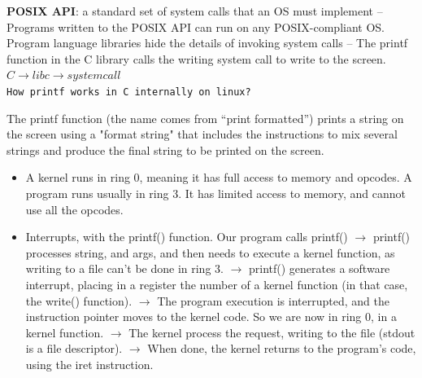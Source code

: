 \documentclass{article}
\begin{document}
\textbf{POSIX API}: a standard set of system calls that an OS must implement – Programs written to the POSIX API can run on any POSIX-compliant OS.
Program language libraries hide the details of invoking system calls – The printf function in the C library calls the writing system call to write to the screen. $C \rightarrow libc \rightarrow systemcall$\\

\texttt{How printf works in C internally on linux?}

The printf function (the name comes from “print formatted”) prints a string on the screen using a "format string" that includes the instructions to mix several strings and produce the final string to be printed on the screen.
\begin{itemize}
    \item A kernel runs in ring 0, meaning it has full access to memory and opcodes. A program runs usually in ring 3. It has limited access to memory, and cannot use all the opcodes.

    \item Interrupts, with the printf() function. Our program calls printf() $\mathbf{\rightarrow}$ printf() processes string, and args, and then needs to execute a kernel function, as writing to a file can't be done in ring 3. $\rightarrow$ printf() generates a software interrupt, placing in a register the number of a kernel function (in that case, the write() function). $\rightarrow$ The program execution is interrupted, and the instruction pointer moves to the kernel code. So we are now in ring 0, in a kernel function. $\rightarrow$ The kernel process the request, writing to the file (stdout is a file descriptor). $\rightarrow$ When done, the kernel returns to the program's code, using the iret instruction.
\end{itemize}
\end{document}
